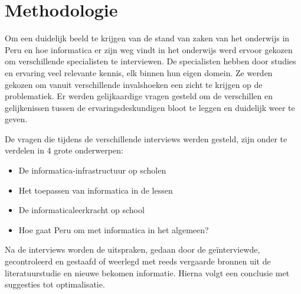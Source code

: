 
\chapter{Methodologie}
\label{ch:methodologie}


Om een duidelijk beeld te krijgen van de stand van zaken van het onderwijs in Peru en hoe informatica er zijn weg vindt in het onderwijs werd ervoor gekozen om verschillende specialisten te interviewen. De specialisten hebben door studies en ervaring veel relevante kennis, elk binnen hun eigen domein. Ze werden gekozen om vanuit verschillende invalshoeken een zicht te krijgen op de problematiek. Er werden gelijkaardige vragen gesteld om de verschillen en gelijkenissen tussen de ervaringsdeskundigen bloot te leggen en duidelijk weer te geven.

De vragen die tijdens de verschillende interviews werden gesteld, zijn onder te verdelen in 4 grote onderwerpen: 

\begin{itemize}
	\item De informatica-infrastructuur op scholen
	\item Het toepassen van informatica in de lessen
	\item De informaticaleerkracht op school
	\item Hoe gaat Peru om met informatica in het algemeen?
\end{itemize}

Na de interviews worden de uitspraken, gedaan door de geïnterviewde, gecontroleerd en gestaafd of weerlegd met reeds vergaarde bronnen uit de literatuurstudie en nieuwe bekomen informatie. Hierna volgt een conclusie met suggesties tot optimalisatie.

